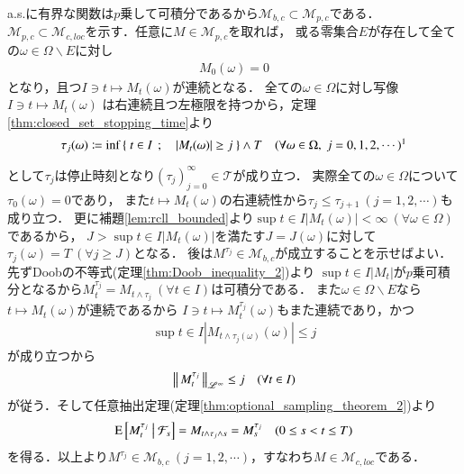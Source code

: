 	\begin{prf}
		a.s.に有界な関数は$p$乗して可積分であるから$\mathcal{M}_{b,c} \subset \mathcal{M}_{p,c}$である．
		$\mathcal{M}_{p,c} \subset \mathcal{M}_{c,loc}$を示す．任意に$M \in \mathcal{M}_{p,c}$を取れば，
		或る零集合$E$が存在して全ての$\omega \in \Omega \backslash E$に対し
		\begin{align}
			M_0(\omega) = 0
		\end{align}
		となり，且つ$I \ni t \longmapsto M_t(\omega)$が連続となる．
		全ての$\omega \in \Omega$に対し写像$I \ni t \longmapsto M_t(\omega)$
		は右連続且つ左極限を持つから，定理\ref{thm:closed_set_stopping_time}より
		\begin{align}
			\tau_j(\omega) \coloneqq \inf{}{\Set{t \in I}{|M_t(\omega)| \geq j}} \wedge T \quad (\forall \omega \in \Omega,\ j=0,1,2,\cdots) \footnotemark
		\end{align}
		として$\tau_j$は停止時刻となり$(\tau_j)_{j=0}^{\infty} \in \mathcal{T}$が成り立つ．
		実際全ての$\omega \in \Omega$について$\tau_0(\omega) = 0$であり，
		また$t \longmapsto M_t(\omega)$の右連続性から$\tau_j \leq \tau_{j+1}\ (j=1,2,\cdots)$も成り立つ．
		更に補題\ref{lem:rcll_bounded}より$\sup{t \in I}{|M_t(\omega)|} < \infty\ (\forall \omega \in \Omega)$であるから，
		$J > \sup{t \in I}{|M_t(\omega)|}$を満たす$J = J(\omega)$に対して$\tau_j(\omega) = T\ (\forall j \geq J)$となる．
		後は$M^{\tau_j} \in \mathcal{M}_{b,c}$が成立することを示せばよい．先ずDoobの不等式(定理\ref{thm:Doob_inequality_2})より
		$\sup{t \in I}{|M_t|}$が$p$乗可積分となるから$M_t^{\tau_j} = M_{t \wedge \tau_j}\ (\forall t \in I)$は可積分である．
		また$\omega \in \Omega \backslash E$なら$t \longmapsto M_t(\omega)$が連続であるから
		$I \ni t \longmapsto M_t^{\tau_j}(\omega)$もまた連続であり，かつ
		\begin{align}
			\sup{t \in I}{\left| M_{t \wedge \tau_j(\omega)}(\omega) \right|} \leq j
			\label{eq:M_pc_M_cloc}
		\end{align}
		が成り立つから
		\begin{align}
			\left\|\, M_t^{\tau_j}\, \right\|_{\mathscr{L}^\infty} \leq j \quad (\forall t \in I)
		\end{align}
		が従う．そして任意抽出定理(定理\ref{thm:optional_sampling_theorem_2})より
		\begin{align}
			\operatorname{E} \left[ M_t^{\tau_j} \ \middle|\ \mathcal{F}_s \right] = M_{t \wedge \tau_j \wedge s} = M_s^{\tau_j} \quad (0 \leq s < t \leq T)
		\end{align}
		を得る．以上より$M^{\tau_j} \in \mathcal{M}_{b,c}\ (j=1,2,\cdots)$，すなわち$M \in \mathcal{M}_{c,loc}$である．
		\QED
	\end{prf}
	
